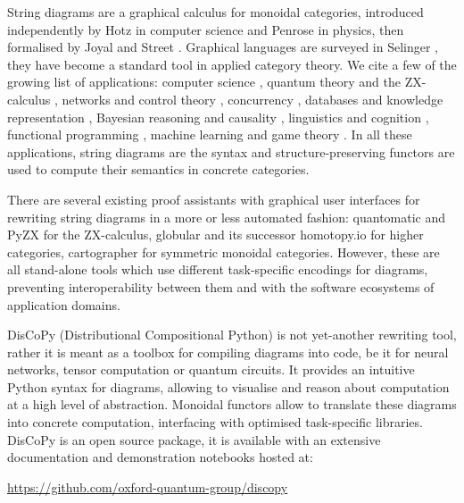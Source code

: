 
String diagrams are a graphical calculus for monoidal categories, introduced independently by Hotz \cite{Hotz65} in computer science and Penrose \cite{Penrose71} in physics, then formalised by Joyal and Street \cite{JoyalStreet88, JoyalStreet91}.
Graphical languages are surveyed in Selinger \cite{Selinger10},
they have become a standard tool in applied category theory.
We cite a few of the growing list of applications:
computer science \cite{BrownHutton94, Abramsky96},
quantum theory and the ZX-calculus \cite{Coecke05,AbramskyCoecke08,CoeckeDuncan08},
networks and control theory \cite{BaezErbele14, BaezFong15, BaezPollard17}, concurrency \cite{BonchiEtAl14a},
databases and
knowledge representation \cite{Patterson17, BonchiEtAl18},
Bayesian reasoning and causality \cite{CoeckeSpekkens12,ChoJacobs19,KissingerUijlen19},
linguistics and cognition \cite{ClarkEtAl08,BoltEtAl17},
functional programming \cite{Riley18},
machine learning and
game theory \cite{FongEtAl17, GhaniEtAl18}.
In all these applications, string diagrams are the syntax and structure-preserving functors are used to compute their semantics in concrete categories.

There are several existing proof assistants with graphical user interfaces for rewriting string diagrams in a more or less automated fashion:
quantomatic \cite{KissingerZamdzhiev15} and PyZX \cite{KissingervandeWetering19} for the ZX-calculus,
globular \cite{BarEtAl} and its successor homotopy.io \cite{ReutterVicary19} for higher categories,
cartographer \cite{SobocinskiEtAl19} for symmetric monoidal categories.
However, these are all stand-alone tools which use different task-specific encodings for diagrams, preventing interoperability between them and with the software ecosystems of application domains.

DisCoPy (Distributional Compositional Python) is not yet-another rewriting tool, rather it is meant as a toolbox for compiling diagrams into code, be it for neural networks, tensor computation or quantum circuits.
It provides an intuitive Python syntax for diagrams, allowing to visualise and reason about computation at a high level of abstraction.
Monoidal functors allow to translate these diagrams into concrete computation, interfacing with optimised task-specific libraries.
DisCoPy is an open source package, it is available with an extensive documentation and demonstration notebooks hosted at:

\url{https://github.com/oxford-quantum-group/discopy}

